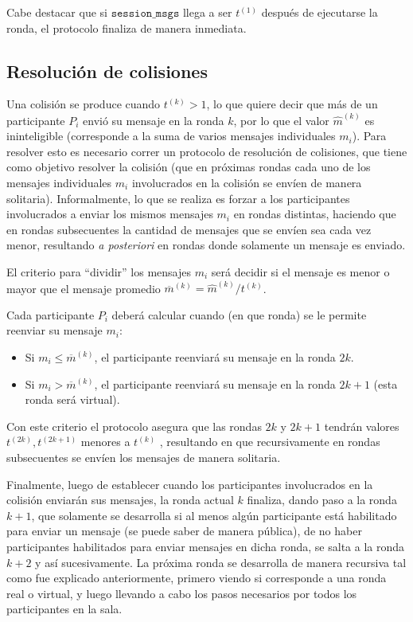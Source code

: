 Cabe destacar que si $\mathtt{session\_msgs}$ llega a ser $t^{(1)}$ después de ejecutarse la ronda, el protocolo finaliza de manera inmediata.

\subsection{Resolución de colisiones}

Una colisión se produce cuando $t^{(k)} > 1$, lo que quiere decir que más de un participante $P_i$ envió su mensaje en la ronda $k$, por lo que el valor $\hat{m}^{(k)}$ es ininteligible (corresponde a la suma de varios mensajes individuales $m_i$). Para resolver esto es necesario correr un protocolo de resolución de colisiones, que tiene como objetivo resolver la colisión (que en próximas rondas cada uno de los mensajes individuales $m_i$ involucrados en la colisión se envíen de manera solitaria). Informalmente, lo que se realiza es forzar a los participantes involucrados a enviar los mismos mensajes $m_i$ en rondas distintas, haciendo que en rondas subsecuentes la cantidad de mensajes que se envíen sea cada vez menor, resultando \emph{a posteriori} en rondas donde solamente un mensaje es enviado.

El criterio para ``dividir'' los mensajes $m_i$ será decidir si el mensaje es menor o mayor que el mensaje promedio $\overline{m}^{(k)} = \hat{m}^{(k)} / t^{(k)}$.

Cada participante $P_i$ deberá calcular cuando (en que ronda) se le permite reenviar su mensaje $m_i$:
\begin{itemize}
    \item Si $m_i \leq \overline{m}^{(k)}$, el participante reenviará su mensaje en la ronda $2k$.
    \item Si $m_i > \overline{m}^{(k)}$, el participante reenviará su mensaje en la ronda $2k + 1$ (esta ronda será virtual).
\end{itemize}

Con este criterio el protocolo asegura que las rondas $2k$ y $2k + 1$ tendrán valores $t^{(2k)}, t^{(2k + 1)}$ menores a $t^{(k)}$  , resultando en que recursivamente en rondas subsecuentes se envíen los mensajes de manera solitaria.

Finalmente, luego de establecer cuando los participantes involucrados en la colisión enviarán sus mensajes, la ronda actual $k$ finaliza, dando paso a la ronda $k+1$, que solamente se desarrolla si al menos algún participante está habilitado para enviar un mensaje (se puede saber de manera pública), de no haber participantes habilitados para enviar mensajes en dicha ronda, se salta a la ronda $k+2$ y así sucesivamente. La próxima ronda se desarrolla de manera recursiva tal como fue explicado anteriormente, primero viendo si corresponde a una ronda real o virtual, y luego llevando a cabo los pasos necesarios por todos los participantes en la sala.

